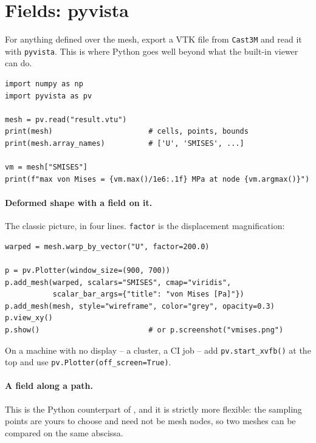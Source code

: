 \section{Fields: pyvista}
\label{sec:py:fields}

%
For anything defined over the mesh, export a VTK file from \texttt{Cast3M}
and read it with \texttt{pyvista}. This is where Python goes well beyond what
the built-in viewer can do.

\begin{codebox}
\begin{verbatim}
import numpy as np
import pyvista as pv

mesh = pv.read("result.vtu")
print(mesh)                      # cells, points, bounds
print(mesh.array_names)          # ['U', 'SMISES', ...]

vm = mesh["SMISES"]
print(f"max von Mises = {vm.max()/1e6:.1f} MPa at node {vm.argmax()}")
\end{verbatim}
\end{codebox}

\paragraph{Deformed shape with a field on it.} The classic picture, in four
lines. \texttt{factor} is the displacement magnification:

\begin{codebox}
\begin{verbatim}
warped = mesh.warp_by_vector("U", factor=200.0)

p = pv.Plotter(window_size=(900, 700))
p.add_mesh(warped, scalars="SMISES", cmap="viridis",
           scalar_bar_args={"title": "von Mises [Pa]"})
p.add_mesh(mesh, style="wireframe", color="grey", opacity=0.3)
p.view_xy()
p.show()                         # or p.screenshot("vmises.png")
\end{verbatim}
\end{codebox}

\noindent On a machine with no display -- a cluster, a CI job -- add
\texttt{pv.start\_xvfb()} at the top and use
\texttt{pv.Plotter(off\_screen=True)}.

\paragraph{A field along a path.} This is the Python counterpart of
, and it is strictly more flexible: the sampling points are
yours to choose and need not be mesh nodes, so two meshes can be compared on
the same abscissa.

